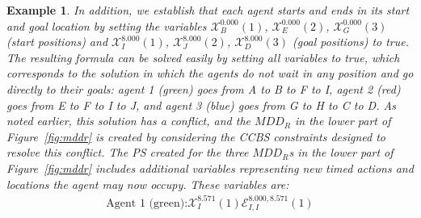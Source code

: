 \documentclass[review]{elsarticle}
\newtheorem{example}{Example}
\newcommand{\mddr}{\ensuremath{MDD_R}\xspace}
\newcommand\roni[1]{\nb{\textbf{Roni:}}{green}{#1}}
\newcommand\pavel[1]{\nb{\textbf{Pavel:}}{blue}{#1}}
\newcommand{\ccbs}{\ac{CCBS}\xspace}
\newcommand{\ps}{\ac{PS}\xspace}
\newcommand{\true}{\textit{true}\xspace}
\begin{document}
\begin{example}
In addition, we establish that each agent starts and ends in its start and goal location by setting the variables $\mathcal{X}_B^{0.000}(1)$, $\mathcal{X}_E^{0.000}(2)$, $\mathcal{X}_G^{0.000}(3)$ (start positions) and $\mathcal{X}_I^{8.000}(1)$, $\mathcal{X}_J^{8.000}(2)$, $\mathcal{X}_D^{8.000}(3)$ (goal positions) to \true.
The resulting formula can be solved easily by setting all variables to \true, which corresponds to the solution in which the agents do not wait in any position and go directly to their goals: agent 1 (green) goes from A to B to F to I, agent 2 (red) goes  from E to F to I to J, 
and agent 3 (blue) goes from G to H to C to D. 
As noted earlier, this solution has a conflict, and the \mddr in the lower part of Figure~\ref{fig:mddr} is created by considering the \ccbs constraints designed to resolve this conflict. 
The \ps created for the three $MDD_R$s in the lower part of Figure~\ref{fig:mddr} includes additional variables representing new timed actions and locations the agent may now occupy. 
These variables are:
\begin{multline*}
\text{Agent 1 (green):} \mathcal{X}_I^{8.571}(1) \mathcal{E}_{I,I}^{8.000,8.571}(1)
\end{multline*}

\end{example}
\end{document}
